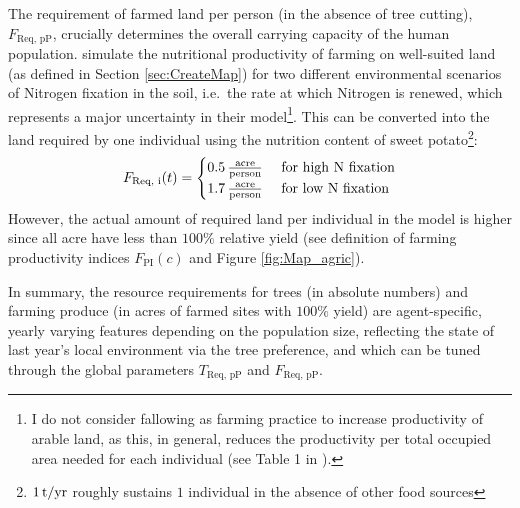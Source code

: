 The requirement of farmed land per person (in the absence of tree cutting), $F_\text{Req, pP}$, crucially determines the overall carrying capacity of the human population.
\citet{Puleston2017} simulate the nutritional productivity of farming on well-suited land (as defined in Section \ref{sec:CreateMap}) for two different environmental scenarios of Nitrogen fixation in the soil, i.e.\ the rate at which Nitrogen is renewed, which represents a major uncertainty in their model\footnote{I do not consider fallowing as farming practice to increase productivity of arable land, as this, in general, reduces the productivity per total occupied area needed for each individual (see Table 1 in ).}.
This can be converted into the land required by one individual using the nutrition content of sweet potato\footnote{$1\, \rm{t/yr}$ roughly sustains $1$ individual in the absence of other food sources}: 
\begin{equation}
F_\text{Req, i}(t) = \begin{cases}
	0.5 \, {\rm \frac{acre}{person} } & \text{ for high N fixation} \\
	1.7 \, {\rm \frac{acre}{person} } & \text{ for low N fixation} \\
 \end{cases}
\end{equation}
However, the actual amount of required land per individual in the model is higher since all acre have less than $100\%$ relative yield (see definition of farming productivity indices $F_\text{PI}(c)$ and Figure \ref{fig:Map_agric}).

In summary, the resource requirements for trees (in absolute numbers) and farming produce (in acres of farmed sites with $100\%$ yield) are agent-specific, yearly varying features depending on the population size, reflecting the state of last year's local environment via the tree preference, and which can be tuned through the global parameters $T_\text{Req, pP}$ and $F_\text{Req, pP}$.

